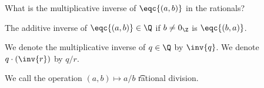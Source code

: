 

What is the multiplicative inverse of $\eqc{(a, b)}$ in the rationals?


\begin{proposition}
  The additive inverse of $\eqc{(a, b)} \in \Q$ if $b \neq 0_{\Z}$ is $\eqc{(b,a)}$.
\end{proposition}


We denote the multiplicative inverse of $q \in \Q$ by $\inv{q}$.
We denote $q \cdot (\inv{r})$ by $q/r$.


We call the operation $(a, b) \mapsto a/b$ \t{rational division}.

\blankpage

